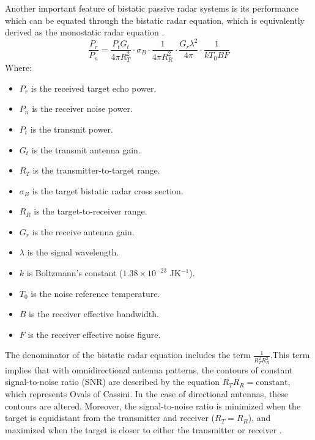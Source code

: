 \documentclass[12pt,a4paper]{article}
\begin{document}
\par \vspace{0.5cm} 
\noindent Another important feature of bistatic passive radar systems is its performance which can be equated through the bistatic radar equation, which is equivalently derived as the monostatic radar equation \cite{FundamentalsPassiveRadar}. 
\vspace{0.5cm} 
\begin{equation}
    \frac{P_r}{P_n} = \frac{P_t G_t}{4\pi R_T^2} \cdot \sigma_B \cdot \frac{1}{4\pi R_R^2} \cdot \frac{G_r \lambda^2}{4\pi} \cdot \frac{1}{k T_0 B F}
\end{equation}
Where:
\begin{multicols}{2}
    \begin{itemize}
    \item \( P_r \) is the received target echo power.
    \item \( P_n \) is the receiver noise power.
    \item \( P_t \) is the transmit power.
    \item \( G_t \) is the transmit antenna gain.
    \item \( R_T \) is the transmitter-to-target range.
    \item \( \sigma_B \) is the target bistatic radar cross section.
    \item \( R_R \) is the target-to-receiver range.
    \item \( G_r \) is the receive antenna gain.
    \item \( \lambda \) is the signal wavelength.
    \item \( k \) is Boltzmann’s constant (\( 1.38 \times 10^{-23} \) JK\(^{-1}\)).
    \item \( T_0 \) is the noise reference temperature.
    \item \( B \) is the receiver effective bandwidth.
    \item \( F \) is the receiver effective noise figure.
    \end{itemize}
\end{multicols}
\noindent The denominator of the bistatic radar equation includes the term \( \frac{1}{R_T^2 R_R^2} \).This term implies that with omnidirectional antenna patterns, the contours of constant signal-to-noise ratio (SNR) are described by the equation \( R_T R_R = \text{constant} \), which represents Ovals of Cassini. In the case of directional antennas, these contours are altered. Moreover, the signal-to-noise ratio is minimized when the target is equidistant from the transmitter and receiver (\( R_T = R_R \)), and maximized when the target is closer to either the transmitter or receiver \cite{FundamentalsPassiveRadar}.
\end{document}
